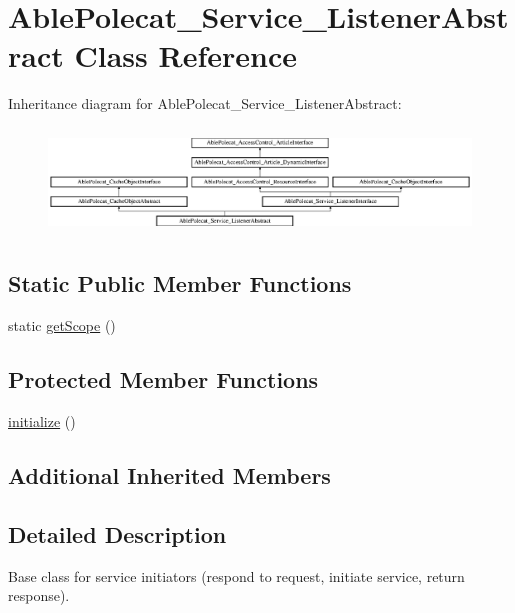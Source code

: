 \hypertarget{class_able_polecat___service___listener_abstract}{}\section{Able\+Polecat\+\_\+\+Service\+\_\+\+Listener\+Abstract Class Reference}
\label{class_able_polecat___service___listener_abstract}
Inheritance diagram for Able\+Polecat\+\_\+\+Service\+\_\+\+Listener\+Abstract\+:\begin{figure}[H]
\begin{center}
\leavevmode
\includegraphics[height=2.845528cm]{class_able_polecat___service___listener_abstract}
\end{center}
\end{figure}
\subsection*{Static Public Member Functions}
\begin{DoxyCompactItemize}
\item 
static \hyperlink{class_able_polecat___service___listener_abstract_ad9ade868bd136d32967059d1cccb3e92}{get\+Scope} ()
\end{DoxyCompactItemize}
\subsection*{Protected Member Functions}
\begin{DoxyCompactItemize}
\item 
\hyperlink{class_able_polecat___service___listener_abstract_a91098fa7d1917ce4833f284bbef12627}{initialize} ()
\end{DoxyCompactItemize}
\subsection*{Additional Inherited Members}


\subsection{Detailed Description}
Base class for service initiators (respond to request, initiate service, return response). 

